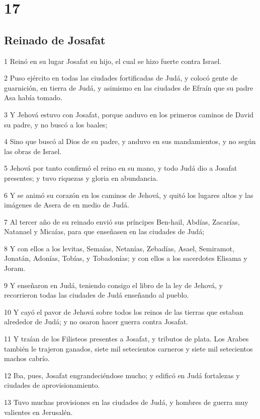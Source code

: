 \chapter{17}

\section*{Reinado de Josafat}

\par 1 Reinó en su lugar Josafat su hijo, el cual se hizo fuerte contra Israel.
\par 2 Puso ejército en todas las ciudades fortificadas de Judá, y colocó gente de guarnición, en tierra de Judá, y asimismo en las ciudades de Efraín que su padre Asa había tomado.
\par 3 Y Jehová estuvo con Josafat, porque anduvo en los primeros caminos de David su padre, y no buscó a los baales;
\par 4 Sino que buscó al Dios de su padre, y anduvo en sus mandamientos, y no según las obras de Israel.
\par 5 Jehová por tanto confirmó el reino en su mano, y todo Judá dio a Josafat presentes; y tuvo riquezas y gloria en abundancia.
\par 6 Y se animó su corazón en los caminos de Jehová, y quitó los lugares altos y las imágenes de Asera de en medio de Judá.
\par 7 Al tercer año de su reinado envió sus príncipes Ben-hail, Abdías, Zacarías, Natanael y Micaías, para que enseñasen en las ciudades de Judá;
\par 8 Y con ellos a los levitas, Semaías, Netanías, Zebadías,  Asael,  Semiramot,  Jonatán,  Adonías, Tobías, y Tobadonías; y con ellos a los sacerdotes Elisama y Joram.
\par 9 Y enseñaron en Judá, teniendo consigo el libro de la ley de Jehová, y recorrieron todas las ciudades de Judá enseñando al pueblo.
\par 10 Y cayó el pavor de Jehová sobre todos los reinos de las tierras que estaban alrededor de Judá; y no osaron hacer guerra contra Josafat.
\par 11 Y traían de los Filisteos presentes a Josafat, y tributos de plata. Los Arabes también le trajeron ganados, siete mil setecientos carneros y siete mil setecientos machos cabrío.
\par 12 Iba, pues, Josafat engrandeciéndose mucho; y edificó en Judá fortalezas y ciudades de aprovisionamiento.
\par 13 Tuvo muchas provisiones en las ciudades de Judá, y hombres de guerra muy valientes en Jerusalén.
